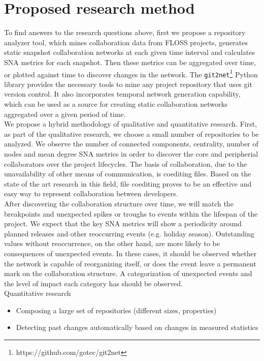 \section{Proposed research method}
To find answers to the research questions above, first we propose a repository analyzer tool, which mines collaboration data from FLOSS projects, generates static snapshot collaboration networks at each given time interval and calculates SNA metrics for each snapshot. Then these metrics can be aggregated over time, or plotted against time to discover changes in the network. The \texttt{git2net}\footnote{https://github.com/gotec/git2net} \cite{goteAnalysingTimeStampedCoEditing2019} Python library provides the necessary tools to mine any project repository that uses git version control. It also incorporates temporal network generation capability, which can be used as a source for creating static collaboration networks aggregated over a given period of time. \\

We propose a hybrid methodology of qualitative and quantitative research. First, as part of the qualitative research, we choose a small number of repositories to be analyzed. We observe the number of connected components, centrality, number of nodes and mean degree SNA metrics in order to discover the core and peripherial collaborators over the project lifecycles. The basis of collaboration, due to the unavailability of other means of communication, is coediting files. Based on the state of the art research in this field, file coediting proves to be an effective and easy way to represent collaboration between developers. \\

After discovering the collaboration structure over time, we will match the breakpoints and unexpected spikes or troughs to events within the lifespan of the project. We expect that the key SNA metrics will show a periodicity around planned releases and other reoccurring events (e.g. holiday season). Outstanding values without reoccurrence, on the other hand, are more likely to be consequences of unexpected events. In these cases, it should be observed whether the network is capable of reorganizing itself, or does the event leave a permanent mark on the collaboration structure. A categorization of unexpected events and the level of impact each category has should be observed. \\

Quantitative research
\begin{itemize}
    \item Composing a large set of repositories (different sizes, properties)
    \item Detecting past changes automatically based on changes in measured statistics
\end{itemize}

